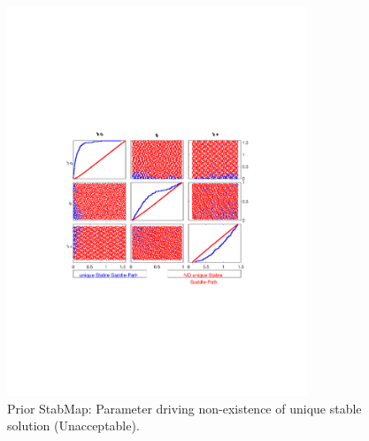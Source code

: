 
\begin{figure}[H]
\centering 
\includegraphics[width=0.8\textwidth]{monetary/gsa/monetary_prior_stable}
\caption{Prior StabMap: Parameter driving non-existence of unique stable solution (Unacceptable).}\label{Fig:monetary_prior_stable}
\end{figure}

